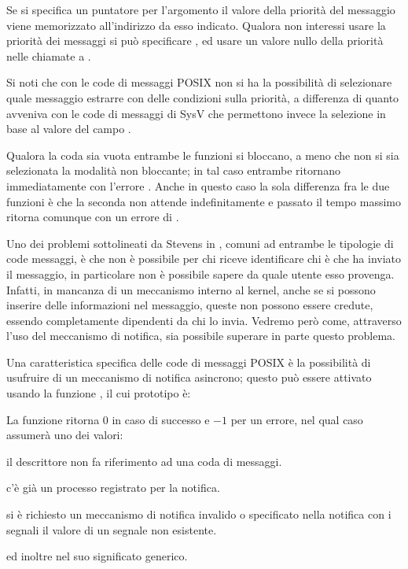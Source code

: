 Se si specifica un puntatore per l'argomento  il valore della
priorità del messaggio viene memorizzato all'indirizzo da esso indicato.
Qualora non interessi usare la priorità dei messaggi si può specificare
, ed usare un valore nullo della priorità nelle chiamate a
.

Si noti che con le code di messaggi POSIX non si ha la possibilità di
selezionare quale messaggio estrarre con delle condizioni sulla priorità, a
differenza di quanto avveniva con le code di messaggi di SysV che permettono
invece la selezione in base al valore del campo . 

Qualora la coda sia vuota entrambe le funzioni si bloccano, a meno che non si
sia selezionata la modalità non bloccante; in tal caso entrambe ritornano
immediatamente con l'errore . Anche in questo caso la sola
differenza fra le due funzioni è che la seconda non attende indefinitamente e
passato il tempo massimo  ritorna comunque con un errore
di .

Uno dei problemi sottolineati da Stevens in \cite{UNP2}, comuni ad entrambe le
tipologie di code messaggi, è che non è possibile per chi riceve identificare
chi è che ha inviato il messaggio, in particolare non è possibile sapere da
quale utente esso provenga. Infatti, in mancanza di un meccanismo interno al
kernel, anche se si possono inserire delle informazioni nel messaggio, queste
non possono essere credute, essendo completamente dipendenti da chi lo invia.
Vedremo però come, attraverso l'uso del meccanismo di notifica, sia possibile
superare in parte questo problema.

Una caratteristica specifica delle code di messaggi POSIX è la possibilità di
usufruire di un meccanismo di notifica asincrono; questo può essere attivato
usando la funzione , il cui prototipo è:

\begin{funcproto}{

}

{La funzione ritorna $0$ in caso di successo e $-1$ per un errore, nel qual
  caso  assumerà uno dei valori:
  \begin{errlist}
    \item[\errcode{EBADF}] il descrittore non fa riferimento ad una coda di
      messaggi.
    \item[\errcode{EBUSY}] c'è già un processo registrato per la notifica.
    \item[\errcode{EINVAL}] si è richiesto un meccanismo di notifica invalido
      o specificato nella notifica con i segnali il valore di un segnale non
      esistente.
  \end{errlist}
  ed inoltre  nel suo significato generico.
}  
\end{funcproto}

